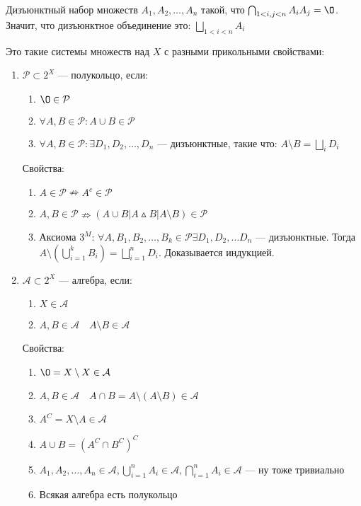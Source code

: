 \documentclass{article}
\begin{document}
Дизъюнктный набор множеств $A_1, A_2, \ldots, A_n$ такой, что $\bigcap_{1 < i, j < n} A_i A_j = \O$. Значит, что дизъюнктное объединение это: $\bigsqcup_{1 < i < n} A_i$

Это такие системы множеств над $X$ с разными прикольными свойствами: 

\begin{enumerate}
    \item $\mathcal{P} \subset 2^X$ --- полукольцо, если: 
        \begin{enumerate}
            \item $\O \in \mathcal{P}$
            \item $\forall A, B \in \mathcal{P}: A \cup B \in \mathcal{P}$
            \item $\forall A, B \in \mathcal{P}: \exists D_1, D_2, \ldots, D_n$ --- дизъюнктные, такие что: $A \setminus B = \bigsqcup_{i} D_i$
        \end{enumerate}
        
        Свойства: 
        \begin{enumerate}
            \item $A \in \mathcal{P} \nRightarrow A^c \in \mathcal{P}$
            \item $A, B \in \mathcal{P} \nRightarrow (A \cup B | A \vartriangle B | A \setminus B) \in \mathcal{P}$
            \item Аксиома $3^M$: $\forall A, B_1, B_2, \ldots, B_k \in \mathcal{P} \exists D_1, D_2, \ldots D_n$ --- дизъюнктные. Тогда $A \setminus \left(\bigcup_{i = 1}^{k} B_i\right) = \bigsqcup_{i = 1}^{n} D_i$. Доказывается индукцией.
        \end{enumerate}

    \item $\mathcal{A} \subset 2^X$ --- алгебра, если: 
        \begin{enumerate}
            \item $X \in \mathcal{A}$
            \item $A, B \in \mathcal{A} \quad A \setminus B \in \mathcal{A}$
        \end{enumerate}

        Свойства: 
        \begin{enumerate}
            \item $\O = X \setminus X \in \mathcal{A}$
            \item $A, B \in \mathcal{A} \quad A \cap B = A \setminus (A \setminus B) \in \mathcal{A}$
            \item $A^C = X \setminus A \in \mathcal{A}$
            \item $A \cup B = (A^C \cap B^C)^C$
            \item $A_1, A_2, \ldots, A_{n} \in \mathcal{A}, \bigcup_{i = 1}^{n} A_i \in \mathcal{A}, \bigcap_{i = 1}^{n} A_i \in \mathcal{A}$ --- ну тоже тривиально
            \item Всякая алгебра есть полукольцо
        \end{enumerate}
    

\end{enumerate}
\end{document}
